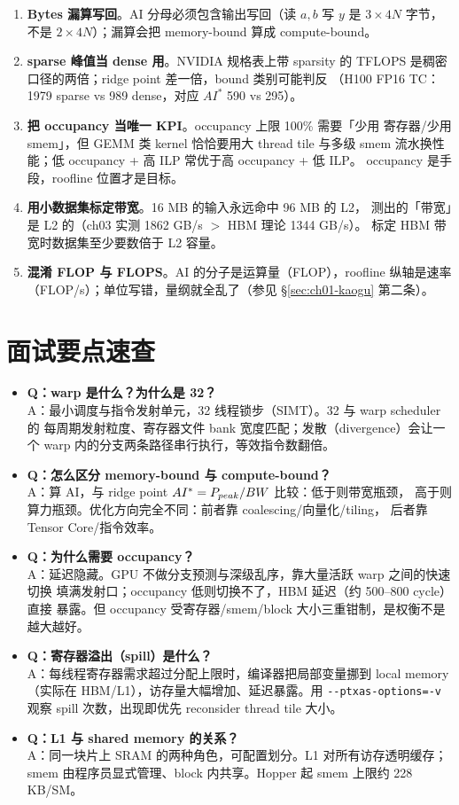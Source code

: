 \begin{enumerate}
\item \textbf{Bytes 漏算写回}。AI 分母必须包含输出写回（读 $a,b$ 写 $y$
  是 $3 \times 4N$ 字节，不是 $2 \times 4N$）；漏算会把 memory-bound 算成
  compute-bound。
\item \textbf{sparse 峰值当 dense 用}。NVIDIA 规格表上带 sparsity 的
  TFLOPS 是稠密口径的两倍；ridge point 差一倍，bound 类别可能判反
  （H100 FP16 TC：1979 sparse vs 989 dense，对应 $AI^{*}$ 590 vs 295）。
\item \textbf{把 occupancy 当唯一 KPI}。occupancy 上限 100\% 需要「少用
  寄存器/少用 smem」，但 GEMM 类 kernel 恰恰要用大 thread tile 与多级
  smem 流水换性能；低 occupancy + 高 ILP 常优于高 occupancy + 低 ILP。
  occupancy 是手段，roofline 位置才是目标。
\item \textbf{用小数据集标定带宽}。16 MB 的输入永远命中 96 MB 的 L2，
  测出的「带宽」是 L2 的（ch03 实测 1862 GB/s $>$ HBM 理论 1344 GB/s）。
  标定 HBM 带宽时数据集至少要数倍于 L2 容量。
\item \textbf{混淆 FLOP 与 FLOPS}。AI 的分子是运算量（FLOP），roofline
  纵轴是速率（FLOP/s）；单位写错，量纲就全乱了（参见
  \S\ref{sec:ch01-kaogu} 第二条）。
\end{enumerate}

\section{面试要点速查}

\begin{itemize}
\item \textbf{Q：warp 是什么？为什么是 32？}\\
  A：最小调度与指令发射单元，32 线程锁步（SIMT）。32 与 warp scheduler 的
  每周期发射粒度、寄存器文件 bank 宽度匹配；发散（divergence）会让一个
  warp 内的分支两条路径串行执行，等效指令数翻倍。
\item \textbf{Q：怎么区分 memory-bound 与 compute-bound？}\\
  A：算 AI，与 ridge point $AI^{*} = P\sb{peak}/BW$ 比较：低于则带宽瓶颈，
  高于则算力瓶颈。优化方向完全不同：前者靠 coalescing/向量化/tiling，
  后者靠 Tensor Core/指令效率。
\item \textbf{Q：为什么需要 occupancy？}\\
  A：延迟隐藏。GPU 不做分支预测与深级乱序，靠大量活跃 warp 之间的快速切换
  填满发射口；occupancy 低则切换不了，HBM 延迟（约 500--800 cycle）直接
  暴露。但 occupancy 受寄存器/smem/block 大小三重钳制，是权衡不是越大越好。
\item \textbf{Q：寄存器溢出（spill）是什么？}\\
  A：每线程寄存器需求超过分配上限时，编译器把局部变量挪到 local memory
  （实际在 HBM/L1），访存量大幅增加、延迟暴露。用
  \texttt{-{}-ptxas-options=\allowbreak{}-v} 观察 spill 次数，出现即优先 reconsider
  thread tile 大小。
\item \textbf{Q：L1 与 shared memory 的关系？}\\
  A：同一块片上 SRAM 的两种角色，可配置划分。L1 对所有访存透明缓存；
  smem 由程序员显式管理、block 内共享。Hopper 起 smem 上限约 228 KB/SM。
\end{itemize}

